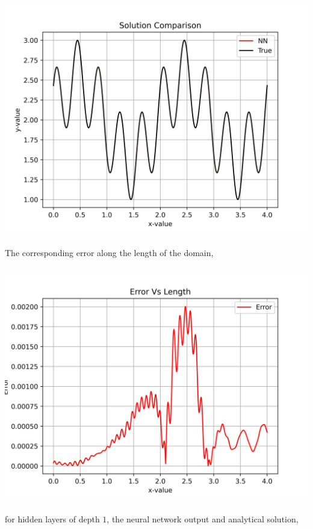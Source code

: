 \documentclass[a4paper, 12pt]{report}
\def\size{0.92}
\begin{document}
\begin{center}
\\~\\\includegraphics[scale=\size]{depthsol2.png}
\\~\\The corresponding error along the length of the domain,
\\~\\\includegraphics[scale=\size]{deptherr2.png}
\\~\\for hidden layers of depth $1$, the neural network output and analytical solution,

\end{center}
\end{document}
